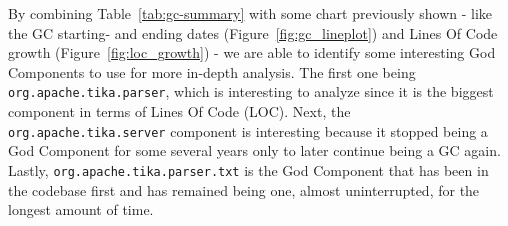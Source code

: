 \documentclass{article}
\begin{document}
By combining Table~\ref{tab:gc-summary} with some chart previously shown - like the GC starting- and ending dates (Figure~\ref{fig:gc_lineplot}) and Lines Of Code growth (Figure~\ref{fig:loc_growth}) - we are able to identify some interesting God Components to use for more in-depth analysis. The first one being \texttt{org.apache.tika.parser}, which is interesting to analyze since it is the biggest component in terms of Lines Of Code (LOC). Next, the \texttt{org.apache.tika.server} component is interesting because it stopped being a God Component for some several years only to later continue being a GC again. Lastly, \texttt{org.apache.tika.parser.txt} is the God Component that has been in the codebase first and has remained being one, almost uninterrupted, for the longest amount of time.

\end{document}
